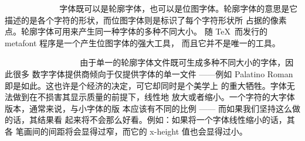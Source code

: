 ~%
~%
~%
~%
~%
~%
~%
~%
字体既可以是轮廓字体，也可以是位图字体。轮廓字体的意思是它
描述的是各个字符的形状，而位图字体则是标识了每个字符形状所
占据的像素点。轮廓字体可用来产生同一种字体的多种不同大小。
随 \TeX\ 而发行的 metafont 程序是一个产生位图字体的强大工具，
而且它并不是唯一的工具。

~%
~%
~%
~%
~%
~%
~%
~%
~%
~%
~%
由于单一的轮廓字体文件既可生成多种不同大小的字体，因此很多
数字字体提供商倾向于仅提供字体的单一文件 ——例如 Palatino
Roman 即是如此。这也许是个经济的决定，可它却同时是个美学上
的重大牺牲。字体无法做到在不损害其显示质量的前提下，线性地
放大或者缩小。一个字符的大字体版本，通常来说，与小字体的版
本应该有不同的比例 —— 而如果我们坚持这么做的话，其结果看
起来将不会那么好看。例如：如果将一个字体线性缩小的话，其各
笔画间的间距将会显得过窄，而它的 x-height 值也会显得过小。

